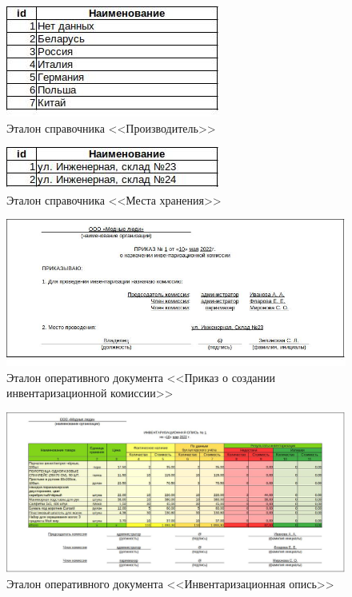 \begin{figure}[!h]
    \centering

    \includegraphics[]
    {assets/etalons/CPR_Proizvoditeli.jpg}

    \caption{Эталон справочника <<Производитель>>}

    \label{fig:CPR_Proizvoditeli}
\end{figure}

\begin{figure}[!h]
    \centering

    \includegraphics[]
    {assets/etalons/CPR_MestaHraneniay.jpg}

    \caption{Эталон справочника <<Места хранения>>}
    
    \label{fig:CPR_MestaHraneniay}
\end{figure}

\begin{figure}[!h]
    \centering

    \includegraphics[width=18cm]
    {assets/etalons/DOC_PrilazSozdaniiInventarizationnojKomissii.jpg}

    \caption{Эталон оперативного документа <<Приказ о создании инвентаризационной комиссии>>}

    \label{fig:DOC_PrilazSozdaniiInventarizationnojKomissii}
\end{figure}

\begin{figure}[!h]
    \centering

    \includegraphics[width=18cm]
    {assets/etalons/DOC_InventarizationnayOpis'.jpg}

    \caption{Эталон оперативного документа <<Инвентаризационная опись>>}

    \label{fig:DOC_InventarizationnayOpis}
\end{figure}
